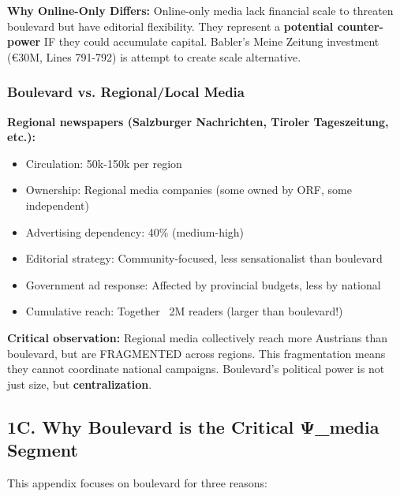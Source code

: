 \textbf{Why Online-Only Differs:}
Online-only media lack financial scale to threaten boulevard but have editorial flexibility.
They represent a \textbf{potential counter-power} IF they could accumulate capital. Babler's
Meine Zeitung investment (€30M, Lines 791-792) is attempt to create scale alternative.

\subsubsection*{Boulevard vs. Regional/Local Media}

\textbf{Regional newspapers (Salzburger Nachrichten, Tiroler Tageszeitung, etc.):}
\begin{itemize}
\item Circulation: 50k-150k per region
\item Ownership: Regional media companies (some owned by ORF, some independent)
\item Advertising dependency: 40\% (medium-high)
\item Editorial strategy: Community-focused, less sensationalist than boulevard
\item Government ad response: Affected by provincial budgets, less by national
\item Cumulative reach: Together ~2M readers (larger than boulevard!)
\end{itemize}

\textbf{Critical observation:} Regional media collectively reach more Austrians than boulevard,
but are FRAGMENTED across regions. This fragmentation means they cannot coordinate national campaigns.
Boulevard's political power is not just size, but \textbf{centralization}.

\label{sec:dx-why-boulevard}

\subsection*{1C. Why Boulevard is the Critical Ψ\_media Segment}

This appendix focuses on boulevard for three reasons:

